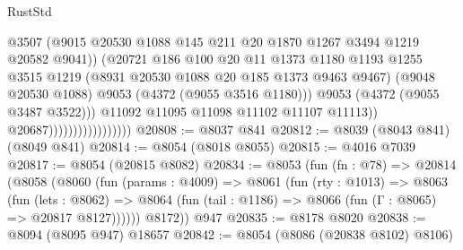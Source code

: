 \begin{lexlean}{RustStd}
\begin{coremodule}
                                              @3507
                                              (@9015
                                                @20530
                                                @1088
                                                @145
                                                @211
                                                @20
                                                @1870
                                                @1267
                                                @3494
                                                @1219
                                                @20582
                                                @9041))
                                            (@20721
                                              @186
                                              @100
                                              @20
                                              @11
                                              @1373
                                              @1180
                                              @1193
                                              @1255
                                              @3515
                                              @1219
                                              (@8931 @20530 @1088 @20 @185 @1373 @9463 @9467)
                                              (@9048 @20530 @1088)
                                              @9053
                                              (@4372 (@9055 @3516 @1180)))
                                            @9053
                                            (@4372 (@9055 @3487 @3522)))
                                          @11092
                                          @11095
                                          @11098
                                          @11102
                                          @11107
                                          @11113))
                                      @20687)))))))))))))))))
@20808 := @8037 @841
@20812 := @8039 (@8043 @841) (@8049 @841)
@20814 := @8054 (@8018 @8055)
@20815 := @4016 @7039
@20817 := @8054 (@20815 @8082)
@20834 := @8053
    (fun (fn : @78) =>
    @20814
      (@8058
        (@8060
          (fun (params : @4009) =>
          @8061
            (fun (rty : @1013) =>
            @8063
              (fun (lets : @8062) =>
              @8064 (fun (tail : @1186) => @8066 (fun (Γ : @8065) => @20817 @8127))))))
        @8172))
    @947
@20835 := @8178 @8020
@20838 := @8094 (@8095 @947) @18657
@20842 := @8054 (@8086 (@20838 @8102) @8106)

\end{coremodule}
\end{lexlean}
